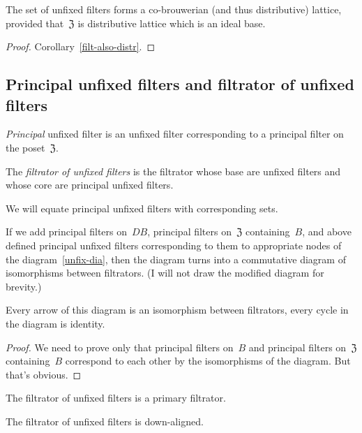 \begin{prop}
The set of unfixed filters forms a co-brouwerian (and thus
distributive) lattice, provided that~$\mathfrak{Z}$ is
distributive lattice which is an ideal base.
\end{prop}

\begin{proof}
Corollary~\ref{filt-also-distr}.
\end{proof}

\subsection{Principal unfixed filters and filtrator of unfixed filters}

\begin{defn}
\emph{Principal} unfixed filter is an unfixed filter
corresponding to a principal filter on the
poset~$\mathfrak{Z}$.
\end{defn}

\begin{defn}
The \emph{filtrator of unfixed filters} is the filtrator
whose base are unfixed filters and whose core are principal
unfixed filters.
\end{defn}

We will equate principal unfixed filters with corresponding
sets.

\begin{thm}
If we add principal filters on~$DB$, principal filters
on~$\mathfrak{Z}$ containing~$B$, and above defined
principal unfixed filters corresponding to them to
appropriate nodes of the diagram~\ref{unfix-dia}, then
the diagram turns into a commutative diagram of isomorphisms
between filtrators. (I will not draw the modified diagram
for brevity.)

Every arrow of this diagram is an isomorphism between
filtrators, every cycle in the diagram is identity.
\end{thm}

\begin{proof}
We need to prove only that principal filters on~$B$ and
principal filters on~$\mathfrak{Z}$ containing~$B$
correspond to each other by the isomorphisms of the diagram.
But that's obvious.
\end{proof}

\begin{obvious}
The filtrator of unfixed filters is a primary filtrator.
\end{obvious}

\begin{obvious}
The filtrator of unfixed filters is down-aligned.
\end{obvious}

